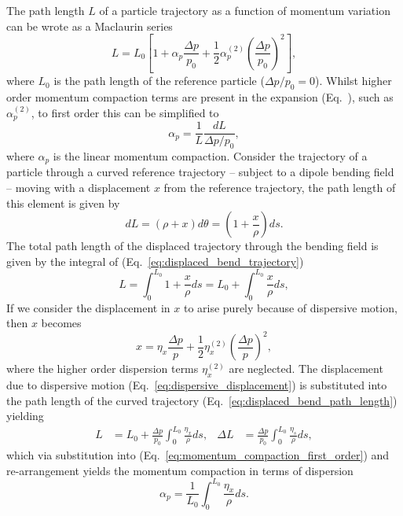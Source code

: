 \documentclass[../main.tex]{subfiles}
\begin{document}
The path length $L$ of a particle trajectory as a function of momentum variation can be wrote as a Maclaurin series \cite{wolski2012longitudinal}
\begin{equation}
L = L_{0}\left[1+\alpha_{p}\frac{\Delta p}{p_{0}}+\frac{1}{2}\alpha_{p}^{\left(2\right)}\left(\frac{\Delta p}{p_{0}}\right)^{2}\right],
\label{eq:path_length_expansion}    
\end{equation}
where $L_{0}$ is the path length of the reference particle ($\Delta p/p_{0}=0$). Whilst higher order momentum compaction terms are present in the expansion (Eq.~), such as $\alpha_{p}^{\left(2\right)}$, to first order this can be simplified to
\begin{equation}
\alpha_{p} = \frac{1}{L}\frac{dL}{\Delta p/p_{0}},
\label{eq:momentum_compaction_first_order}    
\end{equation}
where $\alpha_{p}$ is the linear momentum compaction. Consider the trajectory of a particle through a curved reference trajectory -- subject to a dipole bending field -- moving with a displacement $x$ from the reference trajectory, the path length of this element is given by
\begin{equation}
dL = \left(\rho+x\right)d\theta = \left(1+\frac{x}{\rho}\right)ds.
\label{eq:displaced_bend_trajectory}    
\end{equation}
The total path length of the displaced trajectory through the bending field is given by the integral of (Eq.~\ref{eq:displaced_bend_trajectory})
\begin{equation}
L = \int_{0}^{L_{0}} 1+\frac{x}{\rho} ds = L_{0} + \int_{0}^{L_{0}}\frac{x}{\rho}ds, 
\label{eq:displaced_bend_path_length}    
\end{equation}
If we consider the displacement in $x$ to arise purely because of dispersive motion, then $x$ becomes
\begin{equation}
x = \eta_{x}\frac{\Delta p}{p} + \frac{1}{2}\eta_{x}^{\left(2\right)}\left(\frac{\Delta p}{p}\right)^{2},
\label{eq:dispersive_displacement}    
\end{equation}
where the higher order dispersion terms $\eta_{x}^{\left(2\right)}$ are neglected. The displacement due to dispersive motion (Eq.~\ref{eq:dispersive_displacement}) is substituted into the path length of the curved trajectory (Eq.~\ref{eq:displaced_bend_path_length}) yielding
\begin{align}
L &= L_{0} + \frac{\Delta p}{p_{0}}\int_{0}^{L_{0}}\frac{\eta_{x}}{\rho}ds, &
\Delta L &= \frac{\Delta p}{p_{0}}\int_{0}^{L_{0}}\frac{\eta_{s}}{\rho}ds,
\label{eq:dispersive_path_length_variation}
\end{align}
which via substitution into (Eq.~\ref{eq:momentum_compaction_first_order}) and re-arrangement yields the momentum compaction in terms of dispersion
\begin{equation}
\alpha_{p} = \frac{1}{L_{0}}\int_{0}^{L_{0}}\frac{\eta_{x}}{\rho}ds.
\label{eq:momentum_compaction_dispersion}    
\end{equation}
\end{document}
